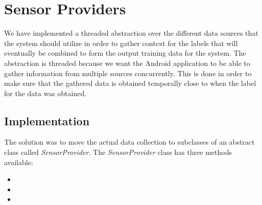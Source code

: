 
\section{Sensor Providers}
\label{sec:sensor_providers}

We have implemented a threaded abstraction over the different data sources that the system should utilize in order to gather context for the labels that will eventually be combined to form the output training data for the system. The abstraction is threaded because we want the Android application to be able to gather information from multiple sources concurrently. This is done in order to make sure that the gathered data is obtained temporally close to when the label for the data was obtained. 


\subsection{Implementation}

The solution was to move the actual data collection to subclasses of an abstract class called \emph{SensorProvider}. The \emph{SensorProvider} class has three methods available: 
\begin{itemize}
	\item {}
	\item {}
	\item {}
\end{itemize}

